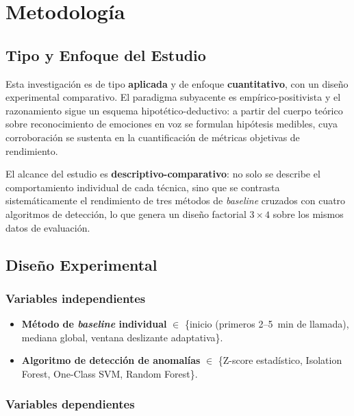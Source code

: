 \section{Metodología}
\label{sec:metodologia}

\subsection{Tipo y Enfoque del Estudio}
\label{sec:met_tipo}

Esta investigación es de tipo \textbf{aplicada} y de enfoque \textbf{cuantitativo}, con
un diseño experimental comparativo. El paradigma subyacente es empírico-positivista y
el razonamiento sigue un esquema hipotético-deductivo: a partir del cuerpo teórico sobre
reconocimiento de emociones en voz se formulan hipótesis medibles, cuya corroboración
se sustenta en la cuantificación de métricas objetivas de rendimiento.

El alcance del estudio es \textbf{descriptivo-comparativo}: no solo se describe el
comportamiento individual de cada técnica, sino que se contrasta sistemáticamente el
rendimiento de tres métodos de \textit{baseline} cruzados con cuatro algoritmos de
detección, lo que genera un diseño factorial $3 \times 4$ sobre los mismos datos de
evaluación.

\subsection{Diseño Experimental}
\label{sec:met_diseno}

\subsubsection{Variables independientes}

\begin{itemize}
    \item \textbf{Método de \textit{baseline} individual} $\in$ \{inicio (primeros
          2--5~min de llamada), mediana global, ventana deslizante adaptativa\}.
    \item \textbf{Algoritmo de detección de anomalías} $\in$ \{Z-score estadístico,
          Isolation Forest, One-Class SVM, Random Forest\}.
\end{itemize}

\subsubsection{Variables dependientes}

